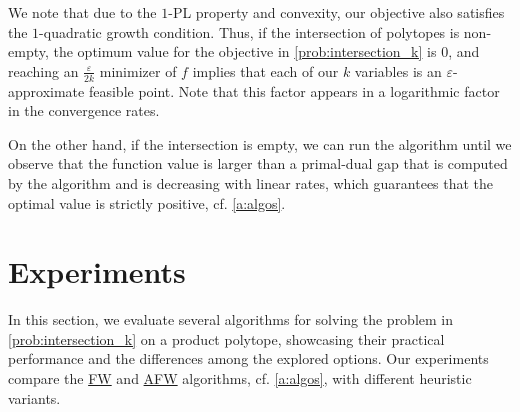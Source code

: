 \documentclass{article}
\newcommand{\mP}{\mathcal{P}}
\let\epsilon\varepsilon
\newif\ifTODO
\newcommand{\Gab}[1]{\ifTODO \todo[inline,author=GI, caption={}, color=aquamarine]{#1} \fi}
\newcommand{\dav}[1]{\ifTODO \todo[size=\scriptsize, color=yellow]{DM: #1}{} \fi}
\newcommand\newlink[2]{\hyperlink{#1}{\normalcolor #2}}
\newcommand{\FW}{\newlink{def:acronym_frank_wolfe}{FW}}
\newcommand{\AFW}{\newlink{def:acronym_away_frank_wolfe}{AFW}}
\newcommand{\LMO}{\newlink{def:acronym_linear_minimization_oracle}{LMO}}
\begin{document}
We note that due to the $1$-PL property and convexity, our objective also satisfies the $1$-quadratic growth condition. Thus, if the intersection of polytopes is non-empty, the optimum value for the objective in \eqref{prob:intersection_k} is $0$, and reaching an $\frac{\epsilon}{2k}$ minimizer of $f$ implies that each of our $k$ variables is an $\epsilon$-approximate feasible point. Note that this factor appears in a logarithmic factor in the convergence rates.

On the other hand, if the intersection is empty, we can run the algorithm until we observe that the function value is larger than a primal-dual gap that is computed by the algorithm and is decreasing with linear rates, which guarantees that the optimal value is strictly positive, cf. \cref{a:algos}.

\dav{We should actually be more explicit about the primal-dual measure, and in fact for the vertex facet case we did not dothe primal-dual proof. The one of the pyramidal width is sketched in  \citep{martinez2025beyond}. It should be done after the deadline and it is also a nice addition to the theory of the paper.}
%
%
%
%
%
%
%
%
%
%
%
%
%
%
%
%
%
%
%
%
\section{Experiments}\label{s:experiments}

In this section, we evaluate several algorithms for solving the problem in \cref{prob:intersection_k} on a product polytope, showcasing their practical performance and the differences among the explored options.
Our experiments compare the \FW{} and \AFW{} algorithms, cf. \cref{a:algos}, with different heuristic variants.
\end{document}
